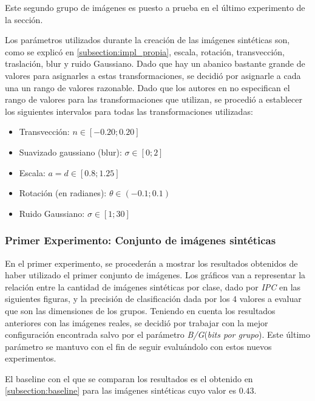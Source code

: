	Este segundo grupo de imágenes es puesto a prueba en el último experimento de la sección.

	Los parámetros utilizados durante la creación de las imágenes sintéticas son, como se explicó en \ref{subsection:impl_propia}, escala, rotación, transvección, traslación, blur y ruido Gaussiano. Dado que hay un abanico bastante grande de valores para asignarles a estas transformaciones, se decidió por asignarle a cada una un rango de valores razonable. Dado que los autores en \cite{wang} no especifican el rango de valores para las transformaciones que utilizan, se procedió a establecer los siguientes intervalos para todas las transformaciones utilizadas:
	
	\begin{itemize}
		\item Transvección: $n \in [-0.20 ; 0.20]$
		\item Suavizado gaussiano (blur): $\sigma \in [0 ; 2]$
		\item Escala: $a=d \in [0.8; 1.25]$
		\item Rotación (en radianes): $\theta \in (-0.1; 0.1)$
		\item Ruido Gaussiano: $\sigma \in [1; 30]$
	\end{itemize}

\subsubsection{Primer Experimento: Conjunto de imágenes sintéticas}
\label{subsubsection:primer-experimento}

	En el primer experimento, se procederán a mostrar los resultados obtenidos de haber utilizado el primer conjunto de imágenes. Los gráficos van a representar la relación entre la cantidad de imágenes sintéticas por clase, dado por \textit{IPC} en las siguientes figuras, y la precisión de clasificación dada por los $4$ valores a evaluar que son las dimensiones de los grupos. Teniendo en cuenta los resultados anteriores con las imágenes reales, se decidió por trabajar con la mejor configuración encontrada salvo por el parámetro \textit{B/G}(\textit{bits por grupo}). Este último parámetro se mantuvo con el fin de seguir evaluándolo con estos nuevos experimentos.
	
	El baseline con el que se comparan los resultados es el obtenido en \ref{subsection:baseline} para las imágenes sintéticas cuyo valor es $0.43$.

